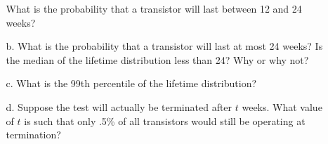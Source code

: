 \documentclass[letterpaper,12pt]{article}
\begin{document}
\begin{enumerate}
\begin{enumerate}
        What is the probability that a transistor will last between 12 and 24 weeks?
      \item[b.]
        What is the probability that a transistor will last at most 24 weeks? Is the median of the lifetime distribution less than 24? Why or why not?
      \item[c.]
        What is the 99th percentile of the lifetime distribution?
      \item[d.]
        Suppose the test will actually be terminated after $t$ weeks. What value of $t$ is such that only .5\% of all transistors would still be operating at termination?
    \end{enumerate}
\end{enumerate}
\end{document}
